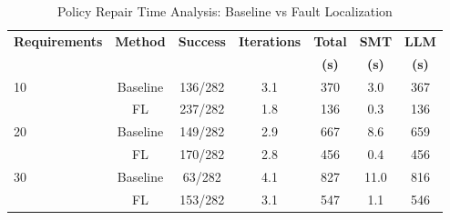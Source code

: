 \begin{table}[t]
\centering
\caption{Policy Repair Time Analysis: Baseline vs Fault Localization}
\label{tab:time_analysis}
\begin{tabular}{@{}lcccccc@{}}
\toprule
\textbf{Requirements} & \textbf{Method} & \textbf{Success} & \textbf{Iterations} & \textbf{Total} & \textbf{SMT} & \textbf{LLM} \\
& & & & \textbf{(s)} & \textbf{(s)} & \textbf{(s)} \\
\midrule
\multirow{2}{*}{10} & Baseline & 136/282 & 3.1 & 370 & 3.0 & 367 \\
 & FL & 237/282 & 1.8 & 136 & 0.3 & 136 \\
\midrule
\multirow{2}{*}{20} & Baseline & 149/282 & 2.9 & 667 & 8.6 & 659 \\
 & FL & 170/282 & 2.8 & 456 & 0.4 & 456 \\
\midrule
\multirow{2}{*}{30} & Baseline & 63/282 & 4.1 & 827 & 11.0 & 816 \\
 & FL & 153/282 & 3.1 & 547 & 1.1 & 546 \\
\bottomrule
\end{tabular}
\end{table}

